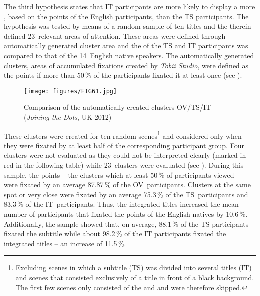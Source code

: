 The third hypothesis states that IT participants are more likely to display a more , based on the  points of the English participants, than the TS participants. The hypothesis was tested by means of a random sample of ten titles and the therein defined 23~relevant areas of attention. These areas were defined through automatically generated cluster area and the  of the TS and IT participants was compared to that of the 14~English native speakers. The automatically generated clusters, areas of accumulated fixations created by \textit{Tobii Studio}, were defined as the  points if more than 50\,\% of the participants fixated it at least once (see ).

\begin{figure}
\texttt{[image: figures/FIG61.jpg]}
\caption{Comparison of the automatically created clusters OV/TS/IT (\textit{Joining the Dots}, UK 2012)}
\label{fig:FIG61}
\end{figure}

These clusters were created for ten random scenes\footnote{Excluding scenes in which a subtitle (TS) was divided into several titles (IT) and scenes that consisted exclusively of a title in front of a black background. The first few scenes only consisted of the  and  and were therefore skipped.} and considered only when they were fixated by at least half of the corresponding participant group. Four clusters were not evaluated as they could not be interpreted clearly (marked in red in the following table) while 23~clusters were evaluated (see ). During this sample, the  points – the clusters which at least 50\,\% of participants viewed – were fixated by an average 87.87\,\% of the OV~participants. Clusters at the same spot or very close were fixated by an average 75.3\,\% of the TS~participants and 83.3\,\% of the IT~participants. Thus, the integrated titles increased the mean number of participants that fixated the  points of the English natives by 10.6\,\%. Additionally, the sample showed that, on average, 88.1\,\% of the TS participants fixated the subtitle while about 98.2\,\% of the IT participants fixated the integrated titles – an increase of 11.5\,\%. 

